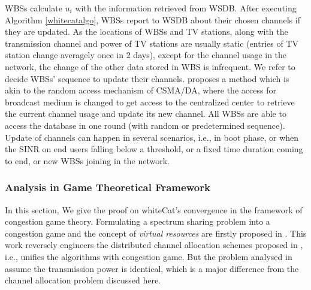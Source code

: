 \documentclass[times]{ettauth}
\newcommand{\ie}{i.e., }
\theoremstyle{mytheoremstyle}
\theoremstyle{mytheoremstyle}
\theoremstyle{mytheoremstyle}
\begin{document}

WBSs calculate $u_i$ with the information retrieved from WSDB.
After executing Algorithm \ref{whitecatalgo}, WBSs report to WSDB about their chosen channels if they are updated.
As the locations of WBSs and TV stations, along with the transmission channel and power of TV stations are usually static (entries of TV station change averagely once in 2 days\cite{SenseLess2011}), except for the channel usage in the network, the change of the other data stored in WBS is infrequent. 
We refer \cite{CApotentialLearning_05dyspan} to decide WBSs' sequence to update their channels.
\cite{CApotentialLearning_05dyspan} proposes a method which is akin to the random access mechanism of CSMA/DA, where the access for broadcast medium is changed to get access to the centralized center to retrieve the current channel usage and update its new channel. 
All WBSs are able to access the database in one round (with random or predetermined sequence). 
Update of channels can happen in several scenarios, \ie in boot phase, or when the SINR on end users falling below a threshold, or a fixed time duration coming to end, or new WBSs joining in the network. 


\subsubsection{Analysis in Game Theoretical Framework}
\label{game}
In this section, We give the proof on whiteCat's convergence in the framework of congestion game theory.
Formulating a spectrum sharing problem into a congestion game and the concept of \textit{virtual resources} are firstly proposed in \cite{allerton08_liu}.
This work reversely engineers the distributed channel allocation schemes proposed in \cite{babadi_08, Ko_DistributedCA}, \ie unifies the algorithms with congestion game.
But the problem analysed in~\cite{allerton08_liu} assume the transmission power is identical, which is a major difference from the channel allocation problem discussed here. 
\end{document}
